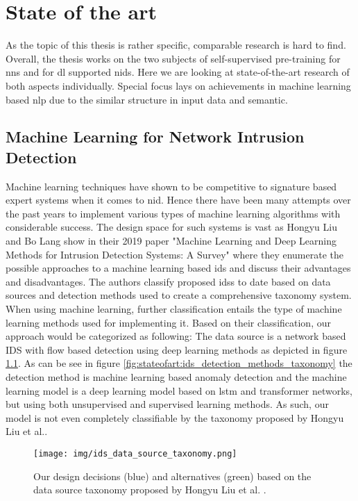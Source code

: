 \chapter{State of the art} \label{sec:stateofart}

As the topic of this thesis is rather specific, comparable research is hard to find. Overall, the thesis works on the two subjects of self-supervised pre-training for \glspl{nn} and for \gls{dl} supported \gls{nids}. Here we are looking at state-of-the-art research of both aspects individually. Special focus lays on achievements in machine learning based \gls{nlp} due to the similar structure in input data and semantic.

\section{Machine Learning for Network Intrusion Detection}

Machine learning techniques have shown to be competitive to signature based expert systems when it comes to \gls{nid}. Hence there have been many attempts over the past years to implement various types of machine learning algorithms with considerable success. The design space for such systems is vast as Hongyu Liu and Bo Lang show in their 2019 paper \cite{nid_ml_survey_2019} "Machine Learning and Deep Learning Methods for Intrusion Detection Systems: A Survey" where they enumerate the possible approaches to a machine learning based \gls{ids} and discuss their advantages and disadvantages. The authors classify proposed \glspl{ids} to date based on data sources and detection methods used to create a comprehensive taxonomy system. When using machine learning, further classification entails the type of machine learning methods used for implementing it. Based on their classification, our approach would be categorized as following: The data source is a network based IDS with flow based detection using deep learning methods as depicted in figure \ref{fig:stateofart:ids_data_source_taxonomy}. As can be see in figure \ref{fig:stateofart:ids_detection_methods_taxonomy} the detection method is machine learning based anomaly detection and the machine learning model is a deep learning model based on \gls{lstm} and transformer networks, but using both unsupervised and supervised learning methods. As such, our model is not even completely classifiable by the taxonomy proposed by Hongyu Liu et al.. \par

\begin{figure}[H]
	\centering
	\texttt{[image: img/ids\_data\_source\_taxonomy.png]}
	\caption{Our design decisions (blue) and alternatives (green) based on the data source taxonomy proposed by Hongyu Liu et al. \cite{nid_ml_survey_2019}.}
	\label{fig:stateofart:ids_data_source_taxonomy}
\end{figure}


